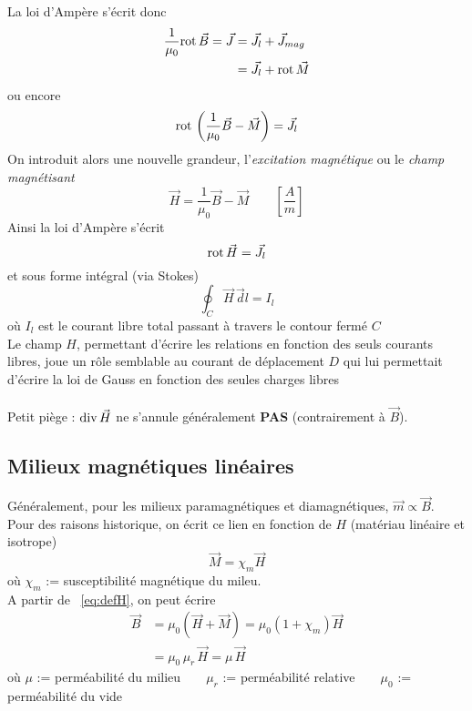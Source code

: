 \documentclass[11pt, a4paper, openany]{book}
\begin{document}
		La loi d'Ampère s'écrit donc 
		\begin{align}
		\frac{1}{\mu_0}\rot\vec B=\vec J & =\vec J_{l}+\vec J_{mag} \\
		& =\vec J_{l}+\rot\vec M   
		\end{align}
		ou encore 
		\begin{equation}
		\rot\left(\frac{1}{\mu_0}\vec B-\vec M\right)=\vec J_{l}
		\end{equation}
		On introduit alors une nouvelle grandeur, l'\textit{excitation magnétique} ou le \textit{champ magnétisant}
		\begin{equation}\label{eq:defH}
		\vec H=\frac{1}{\mu_0}\vec B-\vec M\qquad \left[\frac{A}{m}\right]
		\end{equation}
		Ainsi la loi d'Ampère s'écrit
		\begin{equation}
		\rot\vec H=\vec J_{l}
		\end{equation}
		et sous forme intégral (via Stokes)
		\begin{equation}\label{eq:ampereH}
		\oint_C\vec H\,\vec dl=I_{l}
		\end{equation}
		où $I_{l}$ est le courant libre total passant à travers le contour fermé $C$\\
		
		Le champ $H$, permettant d'écrire les relations en fonction des seuls courants libres, joue un rôle semblable au courant de déplacement $D$ qui lui permettait d'écrire la loi de Gauss en fonction des seules charges libres\\\\
		\danger Petit piège :  $\divv \vec{H}$ ne s'annule généralement \textbf{PAS} (contrairement à $\vec{B}$).
		\subsection{Milieux magnétiques linéaires}
		Généralement, pour les milieux paramagnétiques et diamagnétiques,  $\vec m \propto\vec B$.\ \\
		Pour des raisons historique, on écrit ce lien en fonction de $H$ (matériau linéaire et isotrope)
		\begin{equation}
		\vec M=\chi_m\vec H
		\end{equation}
		où $\chi_m$ := susceptibilité magnétique du mileu.\\
		
		A partir de ~\eqref{eq:defH}, on peut écrire
		\begin{align}
		\vec B & =\mu_0\left(\vec H+\vec M\right)=\mu_0(1+\chi_m)\vec H \\
		& =\mu_0\,\mu_r\,\vec H=\mu\,\vec H                      
		\end{align}
		où $\mu$ := perméabilité du milieu$\qquad\mu_r$ := perméabilité relative$\qquad\mu_0$ := perméabilité du vide\\
		
\end{document}
